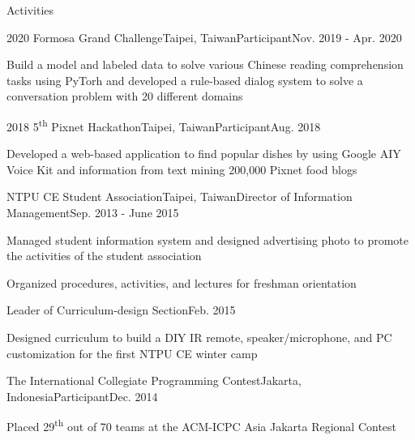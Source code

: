 \documentclass{resume} %
\newcommand{\ts}{\textsuperscript}
\begin{document}
\begin{rSection}{Activities}
    \begin{rSubsection}{2020 Formosa Grand Challenge}{Taipei, Taiwan}{Participant}{Nov. 2019 - Apr. 2020}
        \item Build a model and labeled data to solve various Chinese reading comprehension tasks using PyTorh and 
              developed a rule-based dialog system to solve a conversation problem with 20 different domains
    \end{rSubsection}
    \begin{rSubsection}{2018 5\ts{th} Pixnet Hackathon}{Taipei, Taiwan}{Participant}{Aug. 2018}
        \item Developed a web-based application to find popular dishes by using Google AIY Voice Kit and information from text mining 200,000 Pixnet food blogs
    \end{rSubsection}
    \begin{rSubsection}{NTPU CE Student Association}{Taipei, Taiwan}{Director of Information Management}{Sep. 2013 - June 2015}
        \item Managed student information system and designed advertising photo to promote the activities of the student association
        \item Organized procedures, activities, and lectures for freshman orientation
    \end{rSubsection}
    \begin{rSubsection2}{Leader of Curriculum-design Section}{Feb. 2015}
        \item Designed curriculum to build a DIY IR remote, speaker/microphone, and PC customization for the first NTPU CE winter camp
    \end{rSubsection2}
    \begin{rSubsection}{The International Collegiate Programming Contest}{Jakarta, Indonesia}{Participant}{Dec. 2014}
        \item Placed 29\ts{th} out of 70 teams at the ACM-ICPC Asia Jakarta Regional Contest
    \end{rSubsection}
\end{rSection}

\end{document}
